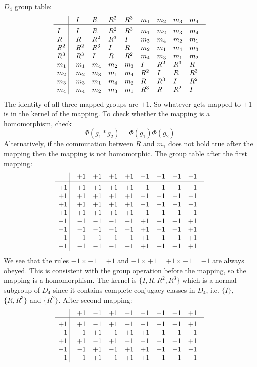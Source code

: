 \documentclass[a4paper]{article}
\begin{document}
\begin{ans}
$D_4$ group table:
$$\vbox{\tabskip0.5em\offinterlineskip
    \halign{\strut$#$\hfil\ \tabskip1em\vrule&&$#$\hfil\cr
     ~& I   & R   & R^2 & R^3 & m_1&m_2&m_3&m_4     \cr
    \noalign{\hrule}\vrule height 12pt width 0pt
     I& I   & R   & R^2 & R^3 & m_1&m_2&m_3&m_4     \cr
    R &R   & R^2   & R^3  & I & m_3 & m_4&m_2&m_1      \cr
    R^2 &R^2   & R^3   & I & R & m_2 & m_1&m_4&m_3      \cr
    R^3 & R^3 & I & R & R^2 & m_4 & m_3&m_1&m_2     \cr
    m_1 & m_1  & m_4  & m_2 & m_3 & I & R^2&R^3&R     \cr
    m_2 & m_2  & m_3  & m_1 & m_4 & R^2 & I&R&R^3     \cr
    m_3 &  m_3  & m_1  & m_4 & m_2 & R & R^3&I&R^2     \cr
    m_4 &   m_4  & m_2  & m_3 & m_1 & R^3 & R&R^2&I     \cr
}}$$
The identity of all three mapped groups are $+1$. So whatever gets mapped to $+1$ is in the kernel of the mapping. To check whether the mapping is a homomorphism, check
$$\Phi(g_1*g_2)=\Phi(g_1)\Phi(g_2)$$
Alternatively, if the commutation between $R$ and $m_1$ does not hold true after the mapping then the mapping is not homomorphic. The group table after the first mapping:
$$\vbox{\tabskip0.5em\offinterlineskip
    \halign{\strut$#$\hfil\ \tabskip1em\vrule&&$#$\hfil\cr
      &+1   & +1   & +1 & +1 & -1&-1&-1&-1     \cr
    \noalign{\hrule}\vrule height 12pt width 0pt
    +1&+1   & +1   & +1 & +1 & -1&-1&-1&-1     \cr
    +1& +1   & +1   & +1  & +1 & -1 & -1&-1&-1      \cr
     +1 & +1  & +1   & +1  & +1 & -1 & -1&-1&-1        \cr
     +1 & +1  & +1   & +1  & +1 & -1 & -1&-1&-1     \cr
    -1 & -1  & -1   & -1  & -1 & +1 & +1&+1&+1       \cr
     -1 & -1  & -1   & -1  & -1 & +1 & +1&+1&+1       \cr
      -1 &-1  & -1   & -1  & -1 & +1 & +1&+1&+1       \cr
      -1 &-1  & -1   & -1  & -1 & +1 & +1&+1&+1     \cr
}}$$
We see that the rules $-1\times-1=+1$ and $-1\times+1=+1\times-1=-1$ are always obeyed. This is consistent with the group operation before the mapping, so the mapping is a homomorphism. The kernel is $\{I,R,R^2,R^3\}$ which is a normal subgroup of $D_4$ since it contains complete conjugacy classes in $D_4$, i.e. $\{I\}$, $\{R,R^3\}$ and $\{R^2\}$. After second mapping:
$$\vbox{\tabskip0.5em\offinterlineskip
    \halign{\strut$#$\hfil\ \tabskip1em\vrule&&$#$\hfil\cr
     &+1   & -1   & +1 & -1 & -1&-1&+1&+1     \cr
    \noalign{\hrule}\vrule height 12pt width 0pt
    +1&+1   & -1   & +1 & -1 & -1&-1&+1&+1     \cr
    -1&-1  & +1   & -1  & +1 &+1 & +1&-1&-1      \cr
    +1 &+1  & -1   & +1 & -1 & -1 & -1&+1&+1      \cr
    -1 &-1  & +1   & -1  & +1 &+1 & +1&-1&-1    \cr
    -1 &-1  & +1   & -1  & +1 &+1 & +1&-1&-1     \cr
}}$$
\end{ans}
\end{document}
